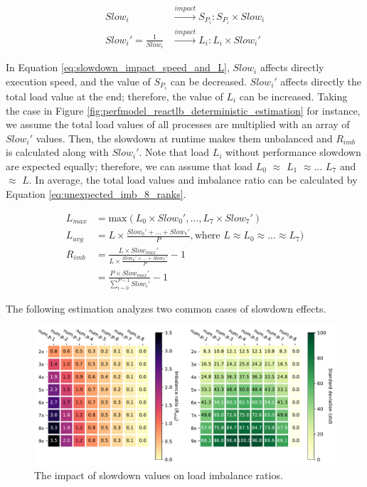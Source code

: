 \begin{equation} \label{eq:slowdown_impact_speed_and_L}
\begin{split}
	Slow_{i} & \overset{impact}{\rightarrow} S_{P_{i}}: S_{P_{i}} \times Slow_{i} \\
	Slow_{i}' = \frac{1}{Slow_{i}} & \overset{impact}{\rightarrow} L_{i}: L_{i} \times Slow_{i}'
\end{split}
\end{equation}

In Equation \ref{eq:slowdown_impact_speed_and_L}, $Slow_{i}$ affects directly execution speed, and the value of $S_{P_{i}}$ can be decreased. $Slow_{i}'$ affects directly the total load value at the end; therefore, the value of $L_{i}$ can be increased. Taking the case in Figure \ref{fig:perfmodel_reactlb_deterministic_estimation} for instance, we assume the total load values of all processes are multiplied with an array of $Slow_{i}'$ values. Then, the slowdown at runtime makes them unbalanced and $R_{imb}$ is calculated along with $Slow_{i}'$. Note that load $L_{i}$ without performance slowdown are expected equally; therefore, we can assume that load $L_{0}$ $\approx$ $L_{1}$ $\approx ... $ $L_{7}$ and $\approx$ $L$. In average, the total load values and imbalance ratio can be calculated by Equation \ref{eq:unexpected_imb_8_ranks}.

\begin{equation} \label{eq:unexpected_imb_8_ranks}
\begin{split}
	L_{max} &= \text{max}(L_{0} \times Slow_{0}', ..., L_{7} \times Slow_{7}') \\
	L_{avg} &= L \times \frac{Slow_{0}' + ... + Slow_{7}'}{P}, \text{where } L \approx L_{0} \approx ... \approx L_{7}) \\
	R_{imb} &= \frac{L \times Slow_{max}'}{L \times \frac{Slow_{0}' + ... + Slow_{7}'}{P}} - 1\\
	        &= \frac{P \times Slow_{max}'}{\sum_{i=0}^{P-1} Slow_{i}'} - 1
\end{split}
\end{equation}

The following estimation analyzes two common cases of slowdown effects.\\

\begin{figure}[t]
  \centering
  \includegraphics[scale=0.625]{./pictures/perf_analysis_model/perf_heatmap_slowdown_impact.pdf}
	\caption{The impact of slowdown values on load imbalance ratios.}
	\label{fig:heatmap_slowdown_impact}
\end{figure}

